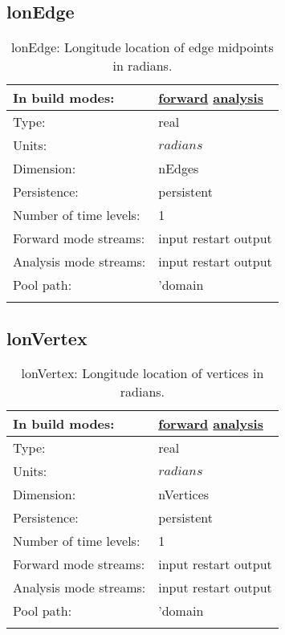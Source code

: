 \subsection[lonEdge]{lonEdge}
\label{subsec:var_sec_mesh_lonEdge}
\begin{center}
\begin{longtable}{| p{2.0in} | p{4.0in} |}
        \hline 
        In build modes: & \hyperref[subsec:forward_var_tab_mesh]{forward} \hyperref[subsec:analysis_var_tab_mesh]{analysis} \\
        \hline 
        Type: & real \\
        \hline 
        Units: & $radians$ \\
        \hline 
        Dimension: & nEdges \\
        \hline 
        Persistence: & persistent \\
        \hline 
        Number of time levels: & 1 \\
        \hline 
		 Forward mode streams: &  input restart output \\
        \hline 
		 Analysis mode streams: &  input restart output \\
        \hline 
            Pool path: & 'domain %
 \\
		 \hline 
    \caption{lonEdge: Longitude location of edge midpoints in radians.}
\end{longtable}
\end{center}
\subsection[lonVertex]{lonVertex}
\label{subsec:var_sec_mesh_lonVertex}
\begin{center}
\begin{longtable}{| p{2.0in} | p{4.0in} |}
        \hline 
        In build modes: & \hyperref[subsec:forward_var_tab_mesh]{forward} \hyperref[subsec:analysis_var_tab_mesh]{analysis} \\
        \hline 
        Type: & real \\
        \hline 
        Units: & $radians$ \\
        \hline 
        Dimension: & nVertices \\
        \hline 
        Persistence: & persistent \\
        \hline 
        Number of time levels: & 1 \\
        \hline 
		 Forward mode streams: &  input restart output \\
        \hline 
		 Analysis mode streams: &  input restart output \\
        \hline 
            Pool path: & 'domain %
 \\
		 \hline 
    \caption{lonVertex: Longitude location of vertices in radians.}
\end{longtable}
\end{center}
